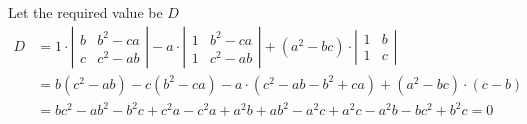 \begin{solution}
    \begin{fullwidth}
    Let the required value be $D$
	\begin{align}
	  D &= 1\cdot\left|
	    \begin{array}{cc}
	      b & b^2-ca \\
	      c & c^2-ab
	    \end{array}
	  \right| - a\cdot \left|
	    \begin{array}{cc}
	      1 & b^2-ca \\
	      1 & c^2-ab
	    \end{array}
	  \right| + (a^2-bc)\cdot\left|
	    \begin{array}{cc}
	      1 & b \\
	      1 & c
	    \end{array}
	  \right| \\
	  &= b(c^2-ab) - c(b^2-ca) -a\cdot(c^2-ab-b^2+ca) + (a^2-bc)\cdot(c-b) \\
	  &= bc^2-ab^2-b^2c+c^2a-c^2a+a^2b+ab^2-a^2c+a^2c-a^2b-bc^2+b^2c = 0
	\end{align}
	\end{fullwidth}
\end{solution}
